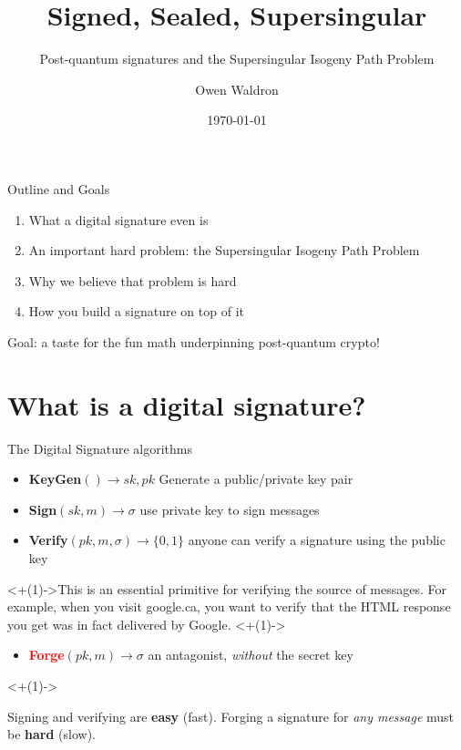 \documentclass[10pt,aspectratio=169]{beamer}
\title{Signed, Sealed, Supersingular}
\subtitle{Post-quantum signatures and the Supersingular Isogeny Path Problem}
\author{Owen Waldron}
\institute{UW PMC S26 SASMS 2}
\date{\today}
\begin{document}
{
\begin{frame}[plain]
  \titlepage
\end{frame}
}

\begin{frame}{Outline and Goals}
  \begin{enumerate}
    \item What a \alert{digital signature} even is
    \item An important hard problem: the \alert{Supersingular Isogeny Path Problem}
    \item Why we believe that problem is \alert{hard}
    \item How you build a signature on top of it 
  \end{enumerate}
  \vspace{1em}
  \centering\small Goal: a taste for the fun math underpinning post-quantum crypto!
\end{frame}

\section{What is a digital signature?}

\begin{frame}{The Digital Signature algorithms}
  \begin{itemize}[<+(1)->]
    \item \textbf{KeyGen}$()\to sk, pk$ \hfill {Generate a public/private key pair}
    \item \textbf{Sign}$(sk, m)\to \sigma$ \hfill use private key to sign messages
    \item \textbf{Verify}$(pk, m, \sigma)\to \{0,1\}$ \hfill anyone can verify a signature using the public key
  \end{itemize}
  \vspace{1.0em}
  \onslide<+(1)->{This is an essential primitive for verifying the source of messages.
  For example, when you visit google.ca, you want to verify that the HTML response you get was in fact delivered by Google.}
  \vspace{1.0em}
  \onslide<+(1)->{
  \begin{itemize}[<+(1)->]
    \item \textcolor{red}{\textbf{Forge}}$(pk, m)\to \sigma$ \hfill an antagonist, \emph{without} the secret key
  \end{itemize}}
  \vspace{1.0em}
  \onslide<+(1)->{
  \begin{alertblock}{}
    Signing and verifying are \textbf{easy} (fast). Forging a signature for \textit{any message} must be \textbf{hard} (slow).
  \end{alertblock}}

\end{frame}
\end{document}
